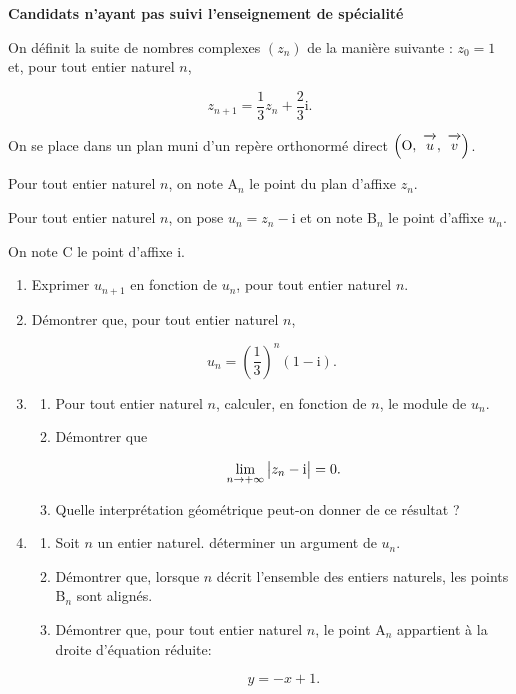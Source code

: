 \documentclass[10pt,a4paper]{article}
\def\i{\text{i}}
\newcommand{\vect}[1]{\overrightarrow{\,\mathstrut#1\,}}
\def\Ouv{$\left(\text{O},~\vect{u},~\vect{v}\right)$}
\begin{document}
\textbf{Candidats n'ayant pas suivi l'enseignement de spécialité}

\bigskip

On définit la suite de nombres complexes $\left(z_n\right)$ de la manière suivante : $z_0 = 1$ et, pour tout entier naturel $n$,

\[z_{n+1} = \dfrac{1}{3} z_{n} + \dfrac{2}{3}\i.\]

On se place dans un plan muni d'un repère orthonormé direct \Ouv.

Pour tout entier naturel $n$, on note A$_{n}$ le point du plan d'affixe $z_n$.

Pour tout entier naturel $n$, on pose $u_n = z_n - \i$ et on note B$_n$ le point d'affixe $u_n$.

On note C le point d'affixe $\i$.

\begin{enumerate}
\item Exprimer $u_{n+1}$ en fonction de $u_n$, pour tout entier naturel $n$.
\item Démontrer que,  pour tout entier naturel $n$,

\[u_n=\left (\dfrac{1}{3}\right )^{n} \left (1-\i\right ).\]

\item 
\begin{enumerate}
\item Pour tout entier naturel $n$, calculer, en fonction de $n$, le module de $u_n$.
\item Démontrer que

\[\lim_{n\to +\infty} \left |z_n-\i \strut\right |=0.\]
\item Quelle interprétation géométrique peut-on donner de ce résultat ?
\end{enumerate}

\item 
	\begin{enumerate}
		\item Soit $n$ un entier naturel. déterminer un argument de $u_n$.
		\item Démontrer que, lorsque $n$ décrit l'ensemble des entiers naturels, les points B$_n$ sont alignés.
		\item Démontrer que, pour tout entier naturel $n$, le point A$_n$ appartient à la droite d'équation réduite:

\[y=-x+1.\]

	\end{enumerate}
\end{enumerate}
\end{document}
